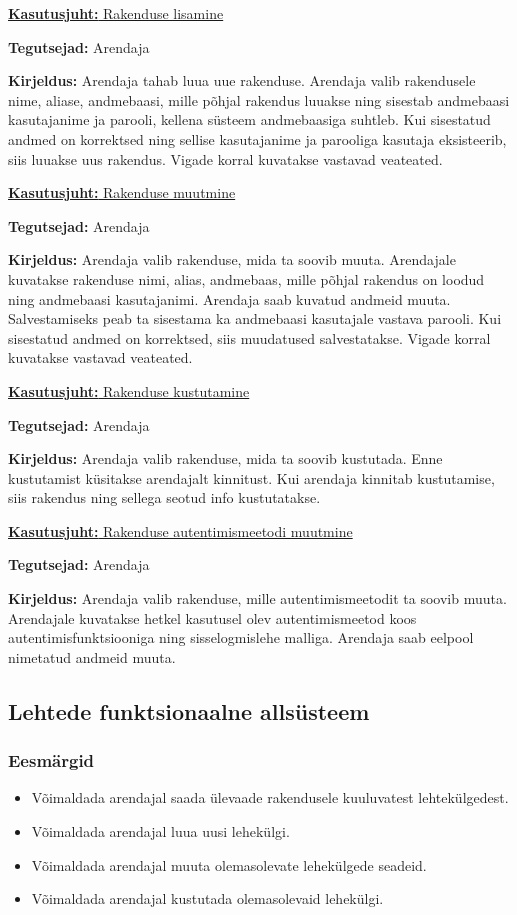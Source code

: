 \documentclass[a4paper,12pt]{article} %
\begin{document}
\underline{\textbf{Kasutusjuht:} Rakenduse lisamine}
\par
\textbf{Tegutsejad:} Arendaja
\par
\textbf{Kirjeldus:} Arendaja tahab luua uue rakenduse. Arendaja valib rakendusele nime, aliase, andmebaasi, mille põhjal rakendus luuakse ning sisestab andmebaasi kasutajanime ja parooli, kellena süsteem andmebaasiga suhtleb. Kui sisestatud andmed on korrektsed ning sellise kasutajanime ja parooliga kasutaja eksisteerib, siis luuakse uus rakendus. Vigade korral kuvatakse vastavad veateated.
\par

\underline{\textbf{Kasutusjuht:} Rakenduse muutmine}
\par
\textbf{Tegutsejad:} Arendaja
\par
\textbf{Kirjeldus:} Arendaja valib rakenduse, mida ta soovib muuta. Arendajale kuvatakse rakenduse nimi, alias, andmebaas, mille põhjal rakendus on loodud ning andmebaasi kasutajanimi. Arendaja saab kuvatud andmeid muuta. Salvestamiseks peab ta sisestama ka andmebaasi kasutajale vastava parooli. Kui sisestatud andmed on korrektsed, siis muudatused salvestatakse. Vigade korral kuvatakse vastavad veateated.
\par

\underline{\textbf{Kasutusjuht:} Rakenduse kustutamine}
\par
\textbf{Tegutsejad:} Arendaja
\par
\textbf{Kirjeldus:} Arendaja valib rakenduse, mida ta soovib kustutada. Enne kustutamist küsitakse arendajalt kinnitust. Kui arendaja kinnitab kustutamise, siis rakendus ning sellega seotud info kustutatakse.
\par

\underline{\textbf{Kasutusjuht:} Rakenduse autentimismeetodi muutmine}
\par
\textbf{Tegutsejad:} Arendaja
\par
\textbf{Kirjeldus:} Arendaja valib rakenduse, mille autentimismeetodit ta soovib muuta. Arendajale kuvatakse hetkel kasutusel olev autentimismeetod koos autentimisfunktsiooniga ning sisselogmislehe malliga. Arendaja saab eelpool nimetatud andmeid muuta.
\par

\subsection{Lehtede funktsionaalne allsüsteem}
\subsubsection{Eesmärgid}
\begin{itemize}
\item Võimaldada arendajal saada ülevaade rakendusele kuuluvatest lehtekülgedest.
\item Võimaldada arendajal luua uusi lehekülgi.
\item Võimaldada arendajal muuta olemasolevate lehekülgede seadeid.
\item Võimaldada arendajal kustutada olemasolevaid lehekülgi.
\end{itemize}
\end{document}
